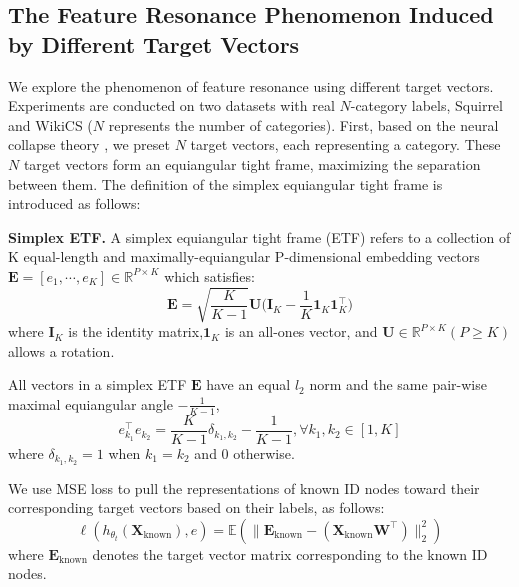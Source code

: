 \subsection{The Feature Resonance Phenomenon Induced by Different Target Vectors}\label{subsec-apdix-FR-diff-target}
We explore the phenomenon of feature resonance using different target vectors. Experiments are conducted on two datasets with real \( N \)-category labels, Squirrel and WikiCS (\( N \) represents the number of categories). First, based on the neural collapse theory \citep{papyan2020prevalence,zhou2022all}, we preset \( N \) target vectors, each representing a category. These \( N \) target vectors form an equiangular tight frame, maximizing the separation between them. The definition of the simplex equiangular tight frame is introduced as follows:
\begin{definition}\label{def-ETF}
\textbf{Simplex ETF.} \citep{xiao2024targeted} A simplex equiangular tight
frame (ETF) refers to a collection of K equal-length and maximally-equiangular P-dimensional embedding vectors $\mathbf{E} = [e_1, \cdots, e_K] \in \mathbb{R}^{P \times K}$ which satisfies:
\begin{equation}
    \mathbf{E} = \sqrt{\frac{K}{K-1}}\mathbf{U}\big( \mathbf{I}_K - \frac{1}{K} \mathbf{1}_K\mathbf{1}_K^{\top} \big)
\end{equation}
where $\mathbf{I}_K$ is the identity matrix,$\mathbf{1}_K$ is an all-ones vector, and
$\mathbf{U} \in \mathbb{R}^{P \times K} (P \geq K) $ allows a rotation.
\end{definition}
All vectors in a simplex ETF $\mathbf{E}$ have an equal $\mathit{l}_2$ norm and
the same pair-wise maximal equiangular angle $-\frac{1}{K-1}$,
\begin{equation}
    e_{k_1}^{\top}e_{k_2} = \frac{K}{K-1}\delta_{k_1,k_2} - \frac{1}{K-1}, \forall k_1, k_2 \in [1, K]
\end{equation}
where $\delta_{k_1, k_2} = 1$ when $k_1 = k_2$ and $0$ otherwise. 

We use MSE loss to pull the representations of known ID nodes toward their corresponding target vectors based on their labels, as follows:
\begin{equation}
    \ell(h_{\theta_t}({\boldsymbol X}_{\text{known}}),e) = \mathbb{E}(\parallel \mathbf{E}_{\text{known}} - ({\boldsymbol X}_{\text{known}}\mathbf{W}^{\top})\parallel^2_2 )
\end{equation}
where \( \mathbf{E}_{\text{known}} \) denotes the target vector matrix corresponding to the known ID nodes.

